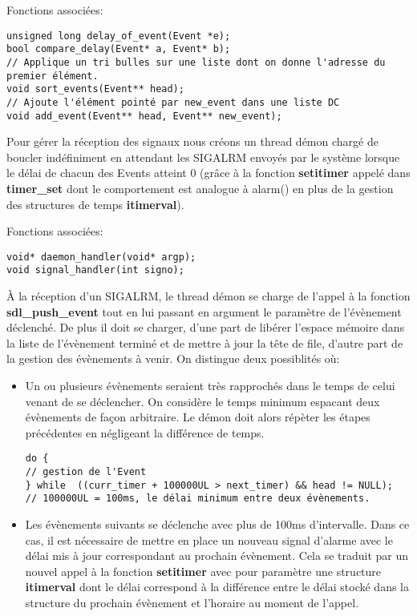 \documentclass[a4paper]{article}
\begin{document}
Fonctions associées:
\begin{verbatim}
unsigned long delay_of_event(Event *e);
bool compare_delay(Event* a, Event* b);
// Applique un tri bulles sur une liste dont on donne l'adresse du premier élément.
void sort_events(Event** head);
// Ajoute l'élément pointé par new_event dans une liste DC 
void add_event(Event** head, Event** new_event);
\end{verbatim}

Pour gérer la réception des signaux nous créons un thread démon chargé de boucler indéfiniment en attendant les SIGALRM envoyés par le système lorsque le délai de chacun des Events atteint 0 (grâce à la fonction \textbf{setitimer} appelé dans \textbf{timer\_set} dont le comportement est analogue à alarm() en plus de la gestion des structures de temps \textbf{itimerval}).

Fonctions associées:
\begin{verbatim}
void* daemon_handler(void* argp);
void signal_handler(int signo);
\end{verbatim}

À la réception d'un SIGALRM, le thread démon se charge de l'appel à la fonction \textbf{sdl\_push\_event} tout en lui passant en argument le paramètre de l'évènement déclenché. De plus il doit se charger, d'une part de libérer l'espace mémoire dans la liste de l'évènement terminé et de mettre à jour la tête de file, d'autre part de la gestion des évènements à venir. On distingue deux possiblités où: 

\begin{itemize}
\item Un ou plusieurs évènements seraient très rapprochés dans le temps de celui venant de se déclencher. On considère le temps minimum espacant deux évènements de façon arbitraire. Le démon doit alors répèter les étapes précédentes en négligeant la différence de temps.
\begin{verbatim}
do { 
// gestion de l'Event
} while  ((curr_timer + 100000UL > next_timer) && head != NULL); 
// 100000UL = 100ms, le délai minimum entre deux évènements.
\end{verbatim}

\item Les évènements suivants se déclenche avec plus de 100ms d'intervalle. Dans ce cas, il est nécessaire de mettre en place un nouveau signal d'alarme avec le délai mis à jour correspondant au prochain évènement. Cela se traduit par un nouvel appel à la fonction \textbf{setitimer} avec pour paramètre une structure \textbf{itimerval} dont le délai correspond à la différence entre le délai stocké dans la structure du prochain évènement et l'horaire au moment de l'appel.
\end{itemize}
\end{document}

